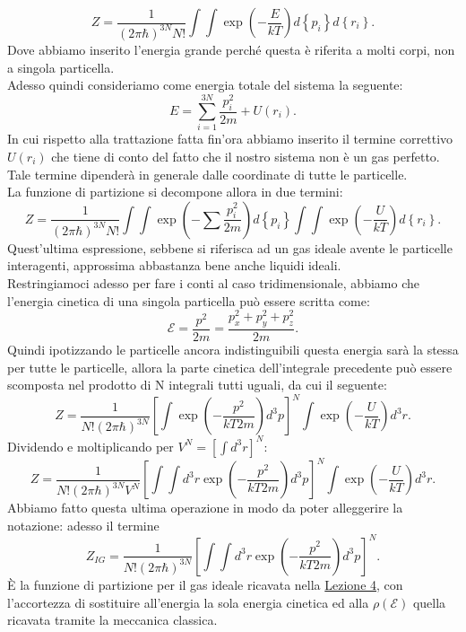 \[
	Z = \frac{1}{\left( 2\pi \hbar  \right) ^{3N}N!} \int \int \exp\left( -\frac{E}{kT} \right) d\left\{ p_{i} \right\} d\left\{ r_{i} \right\} 
.\] 
Dove abbiamo inserito l'energia grande perché questa è riferita a molti corpi, non a singola particella.\\
Adesso quindi consideriamo come energia totale del sistema la seguente:
\[
	E=\sum_{i =1}^{3N} \frac{p_{i}^2}{2m} + U\left(  r_{i}  \right) 
.\] 
In cui rispetto alla trattazione fatta fin'ora abbiamo inserito il termine correttivo $U\left( r_{i} \right) $ che tiene di conto del fatto che il nostro sistema non è un gas perfetto. Tale termine dipenderà in generale dalle coordinate di tutte le particelle. \\
La funzione di partizione si decompone allora in due termini:
\[
	Z = \frac{1}{\left( 2\pi \hbar  \right) ^{3N}N!} \int \int \exp\left( - \sum_{}^{} \frac{p_{i}^2}{2m} \right) d\left\{ p_{i} \right\} 
	\int\int \exp\left( -\frac{U}{kT} \right) d\left\{ r_{i} \right\} 
.\] 
Quest'ultima espressione, sebbene si riferisca ad un gas ideale avente le particelle interagenti, approssima abbastanza bene anche liquidi ideali.\\
Restringiamoci adesso per fare i conti al caso tridimensionale, abbiamo che l'energia cinetica di una singola particella può essere scritta come:
\[
	\mathcal{E} = \frac{p^2}{2m} = \frac{p_{x}^2+p_{y}^2+ p_{z}^2}{2m}
.\] 
Quindi ipotizzando le particelle ancora indistinguibili questa energia sarà la stessa per tutte le particelle, allora la parte cinetica dell'integrale precedente può essere scomposta nel prodotto di N integrali tutti uguali, da cui il seguente:
\[
	Z = \frac{1}{N! \left( 2\pi\hbar \right)^{3N} }
	\left[ \int\exp\left( -\frac{p^2}{kT2m} \right) d^3p \right] ^{N} 
	\int\exp\left( -\frac{U}{kT} \right) d^3r 
.\] 
Dividendo e moltiplicando per $V^{N} =  \left[\int d^3r \right]^{N}$:
\[
	Z = \frac{1}{N! \left( 2\pi\hbar \right)^{3N} V^{N}}
	\left[\int \int d^3r \exp\left( -\frac{p^2}{kT2m} \right) d^3p \right] ^{N} 
	\int\exp\left( -\frac{U}{kT} \right) d^3 r 
.\] 
Abbiamo fatto questa ultima operazione in modo da poter alleggerire la notazione: adesso il termine
\[
	Z_{IG} = \frac{1}{N! \left( 2\pi\hbar \right)^{3N}}
	\left[\int \int d^3r \exp\left( -\frac{p^2}{kT2m} \right) d^3p \right] ^{N}
.\] 
È la funzione di partizione per il gas ideale ricavata nella \hyperref[eq:DefZ]{Lezione 4}, con l'accortezza di sostituire all'energia la sola energia cinetica ed alla $\rho\left( \mathcal{E} \right)$ quella ricavata tramite la meccanica classica.\\
